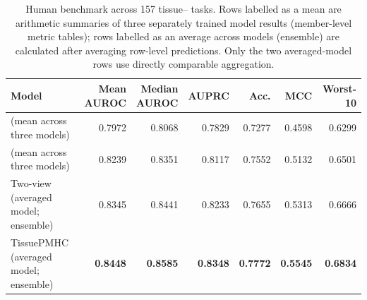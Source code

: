 \begin{table}[tbp]
\centering
\caption{Human \plainFixedTest{} benchmark across 157 tissue--\plainHLA{} tasks. Rows labelled as a mean are arithmetic summaries of three separately trained model results (member-level metric tables); rows labelled as an average across models (ensemble) are calculated after averaging row-level predictions. Only the two averaged-model rows use directly comparable aggregation.}
\label{tab:human-standard}
\footnotesize
\setlength{\tabcolsep}{2pt}
\begin{tabularx}{\textwidth}{>{\raggedright\arraybackslash}Xrrrrrr}
\toprule
Model & \shortstack{Mean\\AUROC} & \shortstack{Median\\AUROC} & AUPRC & Acc. & MCC & Worst-10 \\ 
\midrule
\plainSharedHeads{} (mean across three models) & 0.7972 & 0.8068 & 0.7829 & 0.7277 & 0.4598 & 0.6299 \\ 
\plainAuxDual{} (mean across three models) & 0.8239 & 0.8351 & 0.8117 & 0.7552 & 0.5132 & 0.6501 \\ 
Two-view \plainMLP{} (averaged model; ensemble) & 0.8345 & 0.8441 & 0.8233 & 0.7655 & 0.5313 & 0.6666 \\ 
TissuePMHC (averaged model; ensemble) & \textbf{0.8448} & \textbf{0.8585} & \textbf{0.8348} & \textbf{0.7772} & \textbf{0.5545} & \textbf{0.6834} \\ 
\bottomrule
\end{tabularx}
\end{table}

